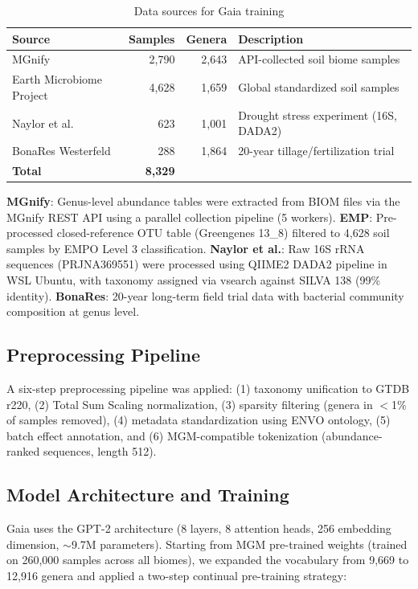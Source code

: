 \documentclass[11pt,a4paper]{article}
\begin{document}
\begin{table}[H]
\centering
\caption{Data sources for Gaia training}
\label{tab:data}
\begin{tabular}{lrrl}
\toprule
Source & Samples & Genera & Description \\
\midrule
MGnify & 2,790 & 2,643 & API-collected soil biome samples \\
Earth Microbiome Project & 4,628 & 1,659 & Global standardized soil samples \\
Naylor et al. & 623 & 1,001 & Drought stress experiment (16S, DADA2) \\
BonaRes Westerfeld & 288 & 1,864 & 20-year tillage/fertilization trial \\
\midrule
\textbf{Total} & \textbf{8,329} & & \\
\bottomrule
\end{tabular}
\end{table}

\textbf{MGnify}: Genus-level abundance tables were extracted from BIOM files via the MGnify REST API using a parallel collection pipeline (5 workers). \textbf{EMP}: Pre-processed closed-reference OTU table (Greengenes 13\_8) filtered to 4,628 soil samples by EMPO Level 3 classification. \textbf{Naylor et al.}: Raw 16S rRNA sequences (PRJNA369551) were processed using QIIME2 DADA2 pipeline in WSL Ubuntu, with taxonomy assigned via vsearch against SILVA 138 (99\% identity). \textbf{BonaRes}: 20-year long-term field trial data with bacterial community composition at genus level.

\subsection{Preprocessing Pipeline}

A six-step preprocessing pipeline was applied: (1) taxonomy unification to GTDB r220, (2) Total Sum Scaling normalization, (3) sparsity filtering (genera in $<$1\% of samples removed), (4) metadata standardization using ENVO ontology, (5) batch effect annotation, and (6) MGM-compatible tokenization (abundance-ranked sequences, length 512).

\subsection{Model Architecture and Training}

Gaia uses the GPT-2 architecture (8 layers, 8 attention heads, 256 embedding dimension, $\sim$9.7M parameters). Starting from MGM pre-trained weights (trained on 260,000 samples across all biomes), we expanded the vocabulary from 9,669 to 12,916 genera and applied a two-step continual pre-training strategy:
\end{document}
